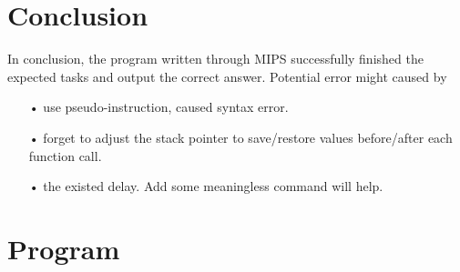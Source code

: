 \documentclass[a4paper]{article}
\begin{document}
	\section{Conclusion}
	In conclusion, the program written through MIPS successfully finished the expected tasks and output the correct answer. Potential error might caused by
	\begin{enumerate}
	\item[•] use pseudo-instruction, caused syntax error.
	\item[•] forget to adjust the stack pointer to save/restore values before/after each function call.
	\item[•] the existed delay. Add some meaningless command will help. 

	\end{enumerate}

	\newpage	
	\appendix
	\section{Program}
\inputminted{asm}{p1.s}

	
\end{document}
